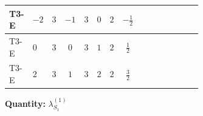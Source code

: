 \documentclass[8pt]{article}
\begin{document}
\begin{landscape}
\begin{longtable}{@{}llcccccc >{\raggedright\arraybackslash}p{0.21\linewidth} >{\raggedright\arraybackslash}p{0.21\linewidth} >{\raggedright\arraybackslash}p{0.21\linewidth}@{}}
\midrule
T3-E & $-2$ & $3$ & $-1$ & $3$ & $0$ & $2$ & $-\frac{1}{2}$ & \scriptsize\adjustbox{max width=\linewidth}{$\begin{gathered} +{g_2}^2 (-24 {\lambda_{S_1}^{(1)}}-12 {\lambda_{S_1}^{(A)}})\end{gathered}$} & \scriptsize\adjustbox{max width=\linewidth}{$\begin{gathered} +\frac{3 {\lambda_{HS_1}^{(A)}}^2}{2}\end{gathered}$} & \scriptsize\adjustbox{max width=\linewidth}{$\begin{gathered} +26 {\lambda_{S_1}^{(A)}}^2\end{gathered}$} \\
\midrule
T3-E & $0$ & $3$ & $0$ & $3$ & $1$ & $2$ & $\frac{1}{2}$ & \scriptsize\adjustbox{max width=\linewidth}{$\begin{gathered} +{g_2}^2 (-24 {\lambda_{S_1}^{(1)}}-12 {\lambda_{S_1}^{(A)}})\end{gathered}$} & \scriptsize\adjustbox{max width=\linewidth}{$\begin{gathered} +\frac{3 {\lambda_{HS_1}^{(A)}}^2}{2}\end{gathered}$} & \scriptsize\adjustbox{max width=\linewidth}{$\begin{gathered} +26 {\lambda_{S_1}^{(A)}}^2\end{gathered}$} \\
\midrule
T3-E & $2$ & $3$ & $1$ & $3$ & $2$ & $2$ & $\frac{3}{2}$ & \scriptsize\adjustbox{max width=\linewidth}{$\begin{gathered} +{g_2}^2 (-24 {\lambda_{S_1}^{(1)}}-12 {\lambda_{S_1}^{(A)}})\end{gathered}$} & \scriptsize\adjustbox{max width=\linewidth}{$\begin{gathered} +\frac{3 {\lambda_{HS_1}^{(A)}}^2}{2}\end{gathered}$} & \scriptsize\adjustbox{max width=\linewidth}{$\begin{gathered} +26 {\lambda_{S_1}^{(A)}}^2\end{gathered}$} \\
\midrule
\bottomrule
\end{longtable}
\clearpage
\noindent\textbf{Quantity: }$\lambda_{S_1}^{(1)}$\par\smallskip

\end{landscape}
\end{document}
